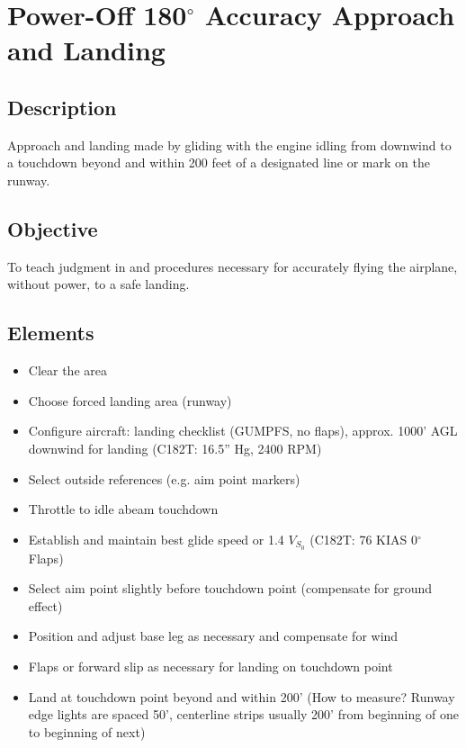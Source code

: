 \section{Power-Off 180$^\circ$ Accuracy Approach and Landing}

\subsection{Description}

Approach and landing made by gliding with the engine idling from downwind to a
touchdown beyond and within 200 feet of a designated line or mark on the
runway.

\subsection{Objective}

To teach judgment in and procedures necessary for accurately flying the
airplane, without power, to a safe landing.

\subsection{Elements}

\begin{itemize}
  \item Clear the area
  \item Choose forced landing area (runway)
  \item Configure aircraft: landing checklist (GUMPFS, no flaps), approx.
    1000' AGL downwind for landing (C182T: 16.5'' Hg, 2400 RPM)
  \item Select outside references (e.g. aim point markers)
  \item Throttle to idle abeam touchdown
  \item Establish and maintain best glide speed or 1.4 $V_{S_0}$ (C182T: 76
    KIAS 0$^\circ$ Flaps)
  \item Select aim point slightly before touchdown point (compensate for ground
    effect)
  \item Position and adjust base leg as necessary and compensate for wind
  \item Flaps or forward slip as necessary for landing on touchdown point
  \item Land at touchdown point beyond and within 200' (How to measure? Runway
    edge lights are spaced 50', centerline strips usually 200' from beginning
    of one to beginning of next)
\end{itemize}

